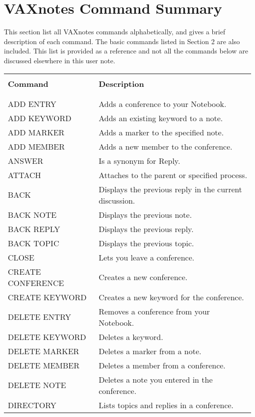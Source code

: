\section {VAXnotes Command Summary}

This section list all VAXnotes commands alphabetically, and gives a brief description of each command.
The basic commands listed in Section 2 are also included. This list is provided as a reference and
not all the commands below are discussed elsewhere in this user note.

\begin{tabular}{ l l }
& \\
\hline
& \\
{\large \bf Command}  & {\large \bf Description} \\
& \\
\hline
& \\
ADD ENTRY               &Adds a conference to your Notebook.\\
ADD KEYWORD		&Adds an existing keyword to a note.\\
ADD MARKER		&Adds a marker to the specified note.\\
ADD MEMBER		&Adds a new member to the conference.\\
ANSWER			&Is a synonym for Reply.\\
ATTACH			&Attaches to the parent or specified process.\\
BACK			&Displays the previous reply in the current discussion.\\
BACK NOTE		& Displays the previous note.\\
BACK REPLY 		& Displays the previous reply.\\
BACK TOPIC		& Displays the previous topic.\\
CLOSE			& Lets you leave a conference.\\
CREATE CONFERENCE	& Creates a new conference.\\
CREATE KEYWORD		& Creates a new keyword for the conference.\\
DELETE ENTRY		& Removes a conference from your Notebook.\\
DELETE KEYWORD		& Deletes a keyword.\\
DELETE MARKER		& Deletes a marker from a note.\\
DELETE MEMBER		& Deletes a member from a conference.\\
DELETE NOTE		& Deletes a note you entered in the conference.\\
DIRECTORY		& Lists topics and replies in a conference.\\

\end{tabular}
